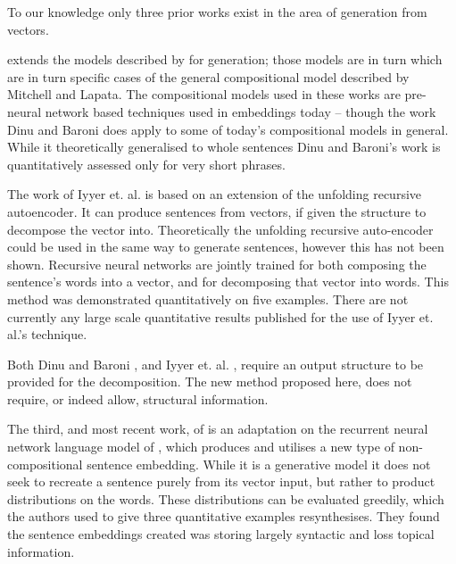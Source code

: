 \documentclass[11pt]{article}
\numberwithin{equation}{section}
\numberwithin{figure}{section}
\theoremstyle{plain}
\theoremstyle{definition}
\begin{document}
To our knowledge only three prior works exist in the area of generation from vectors.

\textcite{Dinu2014CompositionalGeneration}  extends the models described by \textcite{zanzotto2010estimating, Guevara2010} for generation; those models are in turn which are in turn specific cases of the general compositional model described by Mitchell and Lapata\textcite{Mitchell2008}. The compositional models used in these works are pre-neural network based techniques used in embeddings today -- though the work Dinu and Baroni does apply to some of today's compositional models in general. While it theoretically generalised to whole sentences Dinu and Baroni's work is quantitatively assessed only for very short phrases.


The work of Iyyer et. al. \textcite{iyyer2014generating} is based on an extension of the unfolding recursive autoencoder\textcite{SocherEtAl2011:PoolRAE}. It can produce sentences from vectors, if given the structure to decompose the vector into. Theoretically the unfolding recursive auto-encoder could be used in the same way to generate sentences, however this has not been shown. Recursive neural networks are jointly trained for both composing the sentence's words into a vector, and for decomposing that vector into words. This method was demonstrated quantitatively on five examples. There are not currently any large scale quantitative results published for the use of Iyyer et. al.'s technique.

Both Dinu and Baroni \textcite{Dinu2014CompositionalGeneration}, and Iyyer et. al. \textcite{iyyer2014generating}, require an output structure to be provided for the decomposition. The new method proposed here, does not require, or indeed allow, structural information.

The third, and most recent work, of \textcite{Bowman2015SmoothGeneration} is an adaptation on the recurrent neural network language model of \textcite{mikolov2011RnnLM}, which produces and utilises a new type of non-compositional sentence embedding. While it is a generative model it does not seek to recreate a sentence purely from its vector input, but rather to product distributions on the words. These distributions can be evaluated greedily, which the authors used to give three quantitative examples resynthesises. They found the sentence embeddings created was storing largely syntactic and loss topical information. 
\end{document}
